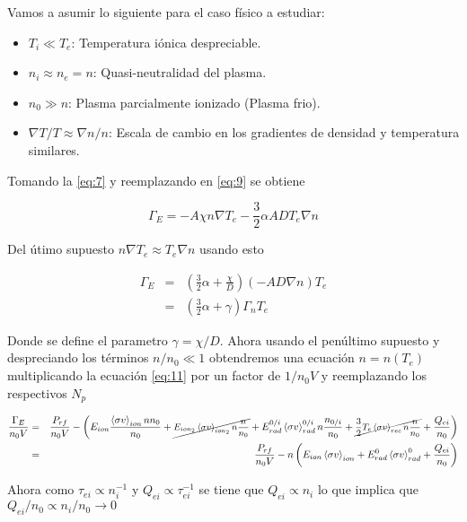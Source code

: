   Vamos a asumir lo siguiente para el caso f\'isico a estudiar:

  \begin{itemize}
    \item $T_i \ll T_e$: Temperatura i\'onica despreciable.
    \item $n_i \approx n_e = n$: Quasi-neutralidad del plasma.
    \item $n_0 \gg n$: Plasma parcialmente ionizado (Plasma frio).
    \item $\nabla T/ T \approx \nabla n / n$: Escala de cambio en los gradientes de densidad y temperatura similares.
  \end{itemize}
  
  Tomando la \eqref{eq:7} y reemplazando en \eqref{eq:9} se obtiene 

  \begin{equation}
    \Gamma_E = -A\chi n \nabla T_e - \frac{3}{2}\alpha ADT_e\nabla n
  \end{equation}

  Del \'utimo supuesto $n \nabla T_e \approx T_e \nabla n$ usando esto

  \begin{eqnarray}\label{eq:11}
    \Gamma_E &=& \left(\frac{3}{2}\alpha + \frac{\chi}{D}\right)(-AD\nabla n)T_e \nonumber \\
             &=& \left(\frac{3}{2}\alpha + \gamma\right)\Gamma_n T_e
  \end{eqnarray}

  Donde se define el parametro $\gamma = \chi/D$. Ahora usando el pen\'ultimo supuesto y despreciando los t\'erminos $n/n_0 \ll 1$ obtendremos una ecuaci\'on $n = n(T_e)$ multiplicando la ecuaci\'on \eqref{eq:11} por un factor de $1/n_0 V$ y reemplazando los respectivos $N_p$

  \begin{eqnarray*}
    \frac{\Gamma_E}{n_0V} &=& \small{\frac{P_{rf}}{n_0V} - \left(E_{ion}\frac{\left<\sigma v\right>_{ion} nn_0 }{n_0 } +\cancel{E_{ion_2}\left<\sigma v\right>_{ion_2} n \frac{n}{n_0} } + E_{rad}^{0/i}\left<\sigma v\right>_{rad}^{0/i}n \frac{n_{0/i}}{n_0} + \cancel{\frac{3}{2}T_e\left<\sigma v\right>_{rec}n \frac{n}{n_0} } + \frac{Q_{ei}}{n_0} \right)} \nonumber\\
                          &=& \frac{P_{rf}}{n_0V} -n \left(E_{ion}\left<\sigma v\right>_{ion} + E_{rad}^0\left<\sigma v\right>_{rad}^0 + \frac{Q_{ei}}{n_0}\right) 
  \end{eqnarray*}

  Ahora como $\tau_{ei} \propto n_i^{-1}$ y $Q_{ei} \propto \tau_{ei}^{-1}$ se tiene que $Q_{ei} \propto n_i$ lo que implica que $Q_{ei}/n_0 \propto n_i/n_0 \rightarrow 0$
  
